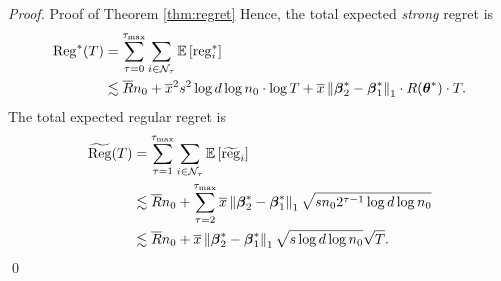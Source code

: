 \begin{proof}{Proof of Theorem \ref{thm:regret}}
Hence, the total expected {\em strong} regret is 
\begin{align*}
	\operatorname{Reg}^{*}(T) & = \sum_{\tau = 0}^{\tau_{\max}} \sum_{i\in{\cal N}_{\tau}} \mathbb{E}\left[ \operatorname{reg}^{*}_i \right] \\
	& \lesssim  \overline{R}n_0 +\overline{x}^2s^2\log d \log n_0 \cdot \log T+ \overline{x} \left\lVert\boldsymbol{\beta}_2^* - \boldsymbol{\beta}_1^*\right\rVert_1\cdot R(\boldsymbol{\theta}^*) \cdot T.
\end{align*}
The total expected regular regret is
\begin{align*}
	\widetilde{\operatorname{Reg}}(T) & = \sum_{\tau = 1}^{\tau_{\max}} \sum_{i\in{\cal N}_{\tau}} \mathbb{E}\left[ \widetilde{\operatorname{reg}}_i \right]  \\
	& \lesssim \overline{R}n_0 + \sum_{\tau = 2}^{\tau_{\max}}  \overline{x} \left\lVert\boldsymbol{\beta}_2^*-\boldsymbol{\beta}_1^*\right\rVert_1\sqrt{sn_02^{\tau-1}\log d \log n_0 }\\
	& \lesssim \overline{R}n_0+ \overline{x} \left\lVert\boldsymbol{\beta}_2^*-\boldsymbol{\beta}_1^*\right\rVert_1\sqrt{s\log d \log n_0 } \sqrt{T}.
\end{align*} \hfill\qed
\end{proof}


